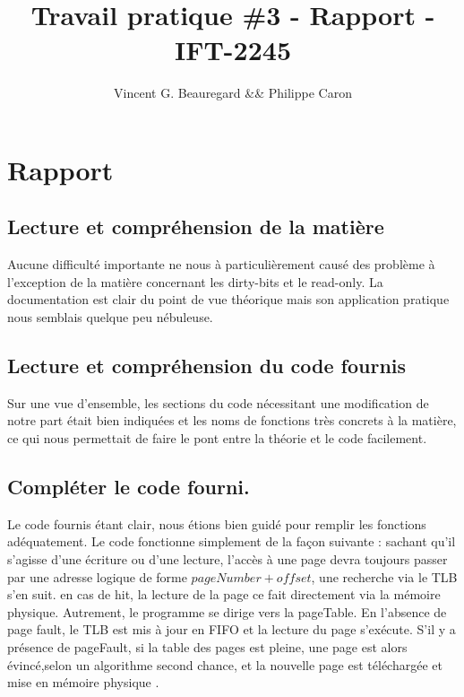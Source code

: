 \documentclass{article}
\title{Travail pratique \#3 - Rapport - IFT-2245}
\author{Vincent G. Beauregard \&\& Philippe Caron}
\begin{document}
	\maketitle
	\newpage

\section*{Rapport}
\subsection*{Lecture et compréhension de la matière}

Aucune difficulté importante ne nous à particulièrement causé des problème à l'exception de la matière concernant les dirty-bits et le read-only. La documentation est clair du point de vue théorique mais son application pratique nous semblais quelque peu nébuleuse.

\subsection*{Lecture et compréhension du code fournis}
Sur une vue d'ensemble, les sections du code nécessitant une modification de notre part était bien indiquées et les noms de fonctions très concrets à la matière, ce qui nous permettait de faire le pont entre la théorie et le code facilement.




\subsection*{Compléter le code fourni.}

Le code fournis étant clair, nous étions bien guidé pour remplir les fonctions adéquatement. Le code fonctionne simplement de la façon suivante : sachant qu'il s'agisse d'une écriture ou d'une lecture, l'accès à une page devra toujours passer par une adresse logique de forme $pageNumber + offset$, une recherche via le TLB s'en suit. en cas de hit, la lecture de la page ce fait directement via la mémoire physique. Autrement, le programme se dirige vers la pageTable. En l'absence de page fault, le TLB est mis à jour en FIFO et la lecture du page s'exécute. S'il y a présence de pageFault, si la table des pages est pleine, une page est alors évincé,selon un algorithme second chance, et la nouvelle page est téléchargée et mise en mémoire physique . 
\end{document}
